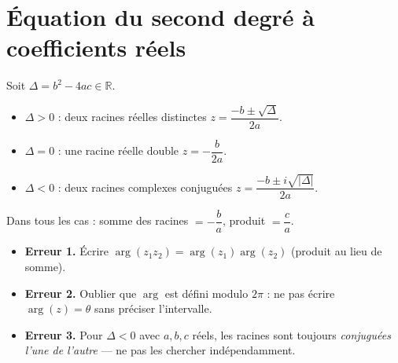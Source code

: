 \documentclass[11pt,a4paper,twoside]{book}
\newcommand{\R}{\mathbb{R}}
\begin{document}
\begin{center}
\end{center}

\section{Équation du second degré à coefficients réels}

\begin{theoremebox}[Équation $az^2 + bz + c = 0$, $a,b,c \in \R$]
Soit $\Delta = b^2 - 4ac \in \R$.
\begin{itemize}
  \item $\Delta > 0$ : deux racines réelles distinctes $z = \dfrac{-b \pm \sqrt{\Delta}}{2a}$.
  \item $\Delta = 0$ : une racine réelle double $z = -\dfrac{b}{2a}$.
  \item $\Delta < 0$ : deux racines complexes conjuguées $z = \dfrac{-b \pm i\sqrt{|\Delta|}}{2a}$.
\end{itemize}
Dans tous les cas : somme des racines $= -\dfrac{b}{a}$, produit $= \dfrac{c}{a}$.
\end{theoremebox}

\begin{erreurbox}
\begin{itemize}
  \item \textbf{Erreur 1.} Écrire $\arg(z_1 z_2) = \arg(z_1)\arg(z_2)$ (produit au lieu de somme).
  \item \textbf{Erreur 2.} Oublier que $\arg$ est défini modulo $2\pi$ : ne pas écrire $\arg(z) = \theta$ sans préciser l'intervalle.
  \item \textbf{Erreur 3.} Pour $\Delta < 0$ avec $a,b,c$ réels, les racines sont toujours \emph{conjuguées l'une de l'autre} — ne pas les chercher indépendamment.
\end{itemize}
\end{erreurbox}
\end{document}

